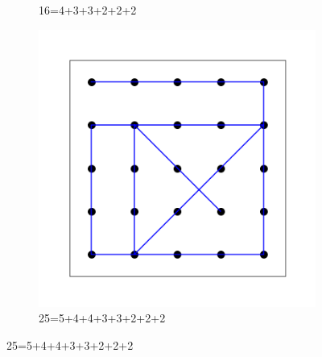 \documentclass[11pt]{article}
\begin{document}
\begin{figure}
\begin{subfigure}[b]{.3\linewidth}
\caption{16=4+3+3+2+2+2}\label{fig-b}
\end{subfigure}
\hfill
\begin{subfigure}[b]{.3\linewidth}
\includegraphics[width=\linewidth]{images/5x5-grid-solution.png}
\caption{25=5+4+4+3+3+2+2+2}\label{fig-c}
\end{subfigure}
\hfill

\end{figure}
\end{document}
